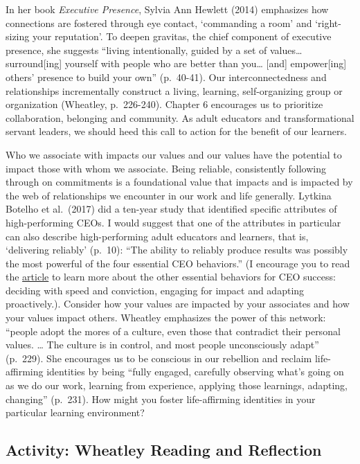\documentclass[
]{book}
\begin{document}
In her book \emph{Executive Presence}, Sylvia Ann Hewlett (2014) emphasizes how connections are fostered through eye contact, `commanding a room' and `right-sizing your reputation'. To deepen gravitas, the chief component of executive presence, she suggests ``living intentionally, guided by a set of values\ldots{} surround{[}ing{]} yourself with people who are better than you\ldots{} {[}and{]} empower{[}ing{]} others' presence to build your own'' (p.~40-41). Our interconnectedness and relationships incrementally construct a living, learning, self-organizing group or organization (Wheatley, p.~226-240). Chapter 6 encourages us to prioritize collaboration, belonging and community. As adult educators and transformational servant leaders, we should heed this call to action for the benefit of our learners.

Who we associate with impacts our values and our values have the potential to impact those with whom we associate. Being reliable, consistently following through on commitments is a foundational value that impacts and is impacted by the web of relationships we encounter in our work and life generally. Lytkina Botelho et al.~(2017) did a ten-year study that identified specific attributes of high-performing CEOs. I would suggest that one of the attributes in particular can also describe high-performing adult educators and learners, that is, `delivering reliably' (p.~10): ``The ability to reliably produce results was possibly the most powerful of the four essential CEO behaviors.'' (I encourage you to read the \href{https://hbr.org/2017/05/what-sets-successful-ceos-apart}{article} to learn more about the other essential behaviors for CEO success: deciding with speed and conviction, engaging for impact and adapting proactively.). Consider how your values are impacted by your associates and how your values impact others. Wheatley emphasizes the power of this network: ``people adopt the mores of a culture, even those that contradict their personal values. \ldots{} The culture is in control, and most people unconsciously adapt'' (p.~229). She encourages us to be conscious in our rebellion and reclaim life-affirming identities by being ``fully engaged, carefully observing what's going on as we do our work, learning from experience, applying those learnings, adapting, changing'' (p.~231). How might you foster life-affirming identities in your particular learning environment?

\hypertarget{activity-wheatley-reading-and-reflection-2}{%
\subsection*{Activity: Wheatley Reading and Reflection}\label{activity-wheatley-reading-and-reflection-2}}
\end{document}

